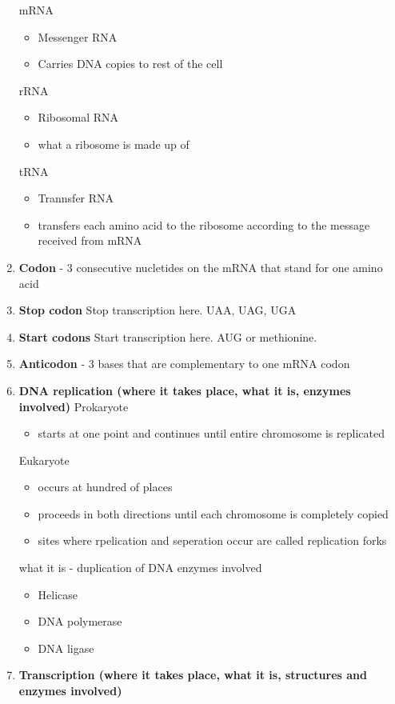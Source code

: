 \documentclass[9pt]{article}
\begin{document}
\begin{enumerate}
  mRNA
  \begin{itemize}
    \item Messenger RNA
    \item Carries DNA copies to rest of the cell
  \end{itemize}
  rRNA
  \begin{itemize}
    \item Ribosomal RNA
    \item what a ribosome is made up of
  \end{itemize}
  tRNA
  \begin{itemize}
    \item Trannsfer RNA
    \item transfers each amino acid to the ribosome according to the message received from mRNA
  \end{itemize}
  \item {\bf Codon} - 3 consecutive nucletides on the mRNA that stand for one amino acid
  \item {\bf Stop codon} Stop transcription here. UAA, UAG, UGA
  \item {\bf Start codons} Start transcription here. AUG or methionine.
  \item {\bf Anticodon} - 3 bases that are complementary to one mRNA codon
  \item {\bf DNA replication (where it takes place, what it is, enzymes involved)}
  Prokaryote
  \begin{itemize}
    \item starts at one point and continues until entire chromosome is replicated
  \end{itemize}
  Eukaryote
  \begin{itemize}
    \item occurs at hundred of places
    \item proceeds in both directions until each chromosome is completely copied
    \item sites where rpelication and seperation occur are called replication forks
  \end{itemize}
  what it is - duplication of DNA
  enzymes involved
  \begin{itemize}
    \item Helicase
    \item DNA polymerase
    \item DNA ligase
  \end{itemize}
  \item {\bf Transcription (where it takes place, what it is, structures and enzymes involved)}

\end{enumerate}
\end{document}
